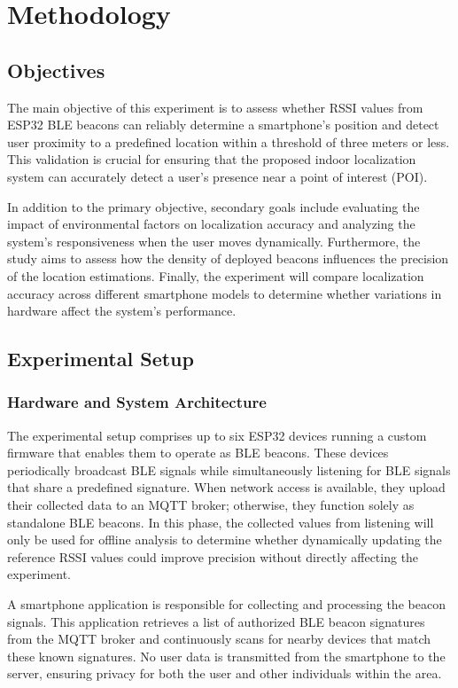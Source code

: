 \chapter{Methodology}

\section{Objectives}

The main objective of this experiment is to assess whether RSSI values from ESP32 BLE beacons can reliably determine a smartphone’s position and detect user proximity to a predefined location within a threshold of three meters or less. This validation is crucial for ensuring that the proposed indoor localization system can accurately detect a user's presence near a point of interest (POI).

In addition to the primary objective, secondary goals include evaluating the impact of environmental factors on localization accuracy and analyzing the system’s responsiveness when the user moves dynamically. Furthermore, the study aims to assess how the density of deployed beacons influences the precision of the location estimations. Finally, the experiment will compare localization accuracy across different smartphone models to determine whether variations in hardware affect the system’s performance.

\section{Experimental Setup}

\subsection{Hardware and System Architecture}

The experimental setup comprises up to six ESP32 devices running a custom firmware that enables them to operate as BLE beacons. These devices periodically broadcast BLE signals while simultaneously listening for BLE signals that share a predefined signature. When network access is available, they upload their collected data to an MQTT broker; otherwise, they function solely as standalone BLE beacons. In this phase, the collected values from listening will only be used for offline analysis to determine whether dynamically updating the reference RSSI values could improve precision without directly affecting the experiment.

A smartphone application is responsible for collecting and processing the beacon signals. This application retrieves a list of authorized BLE beacon signatures from the MQTT broker and continuously scans for nearby devices that match these known signatures. No user data is transmitted from the smartphone to the server, ensuring privacy for both the user and other individuals within the area.

